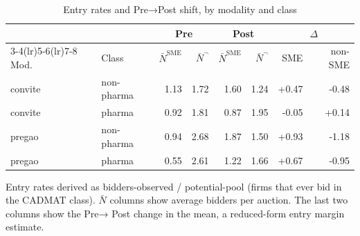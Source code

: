 \begin{table}[htbp]
\centering
\begin{threeparttable}
\caption{Entry rates and Pre→Post shift, by modality and class}
\label{tab:v3_entry_rates}
\small
\begin{tabular}{llrrrrrr}
\toprule
 & & \multicolumn{2}{c}{Pre} & \multicolumn{2}{c}{Post} & \multicolumn{2}{c}{$\Delta$} \\
\cmidrule(lr){3-4}\cmidrule(lr){5-6}\cmidrule(lr){7-8}
Mod. & Class & $\bar N^{\text{SME}}$ & $\bar N^{\neg}$ & $\bar N^{\text{SME}}$ & $\bar N^{\neg}$ & SME & non-SME \\
\midrule
convite & non-pharma & 1.13 & 1.72 & 1.60 & 1.24 & +0.47 & -0.48 \\
convite & pharma & 0.92 & 1.81 & 0.87 & 1.95 & -0.05 & +0.14 \\
pregao & non-pharma & 0.94 & 2.68 & 1.87 & 1.50 & +0.93 & -1.18 \\
pregao & pharma & 0.55 & 2.61 & 1.22 & 1.66 & +0.67 & -0.95 \\
\bottomrule
\end{tabular}
\begin{tablenotes}\footnotesize
\item Entry rates derived as bidders-observed / potential-pool
(firms that ever bid in the CADMAT class). $\bar N$ columns show
average bidders per auction. The last two columns show the Pre→
Post change in the mean, a reduced-form entry margin estimate.
\end{tablenotes}
\end{threeparttable}
\end{table}
